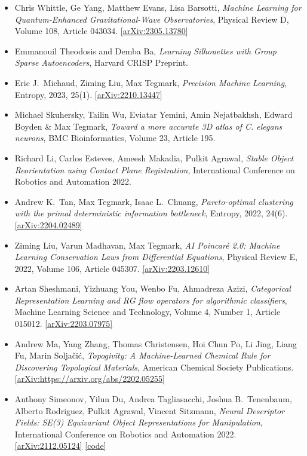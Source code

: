 \begin{itemize}
\item Chris Whittle, Ge Yang, Matthew Evans, Lisa Barsotti, \textit{Machine Learning for Quantum-Enhanced Gravitational-Wave Observatories}, Physical Review D, Volume 108, Article 043034. \href{https://arxiv.org/abs/2305.13780}{[arXiv:2305.13780]} 
\item Emmanouil Theodosis and Demba Ba, \textit{Learning Silhouettes with Group Sparse Autoencoders}, Harvard CRISP Preprint. 
\item Eric J.\  Michaud, Ziming Liu, Max Tegmark, \textit{Precision Machine Learning}, Entropy, 2023, 25(1). \href{https://arxiv.org/abs/2210.13447}{[arXiv:2210.13447]} 
\item Michael Skuhersky, Tailin Wu, Eviatar Yemini, Amin Nejatbakhsh, Edward Boyden & Max Tegmark, \textit{Toward a more accurate 3D atlas of C. elegans neurons}, BMC Bioinformatics, Volume 23, Article 195. 
\item Richard Li, Carlos Esteves, Ameesh Makadia, Pulkit Agrawal, \textit{Stable Object Reorientation using Contact Plane Registration}, International Conference on Robotics and Automation 2022. 
\item Andrew K.\  Tan, Max Tegmark, Isaac L.\  Chuang, \textit{Pareto-optimal clustering with the primal deterministic information bottleneck}, Entropy, 2022, 24(6). \href{https://arxiv.org/abs/2204.02489}{[arXiv:2204.02489]} 
\item Ziming Liu, Varun Madhavan, Max Tegmark, \textit{AI Poincaré 2.0: Machine Learning Conservation Laws from Differential Equations}, Physical Review E, 2022, Volume 106, Article 045307. \href{https://arxiv.org/abs/2203.12610}{[arXiv:2203.12610]} 
\item Artan Sheshmani, Yizhuang You, Wenbo Fu, Ahmadreza Azizi, \textit{Categorical Representation Learning and RG flow operators for algorithmic classifiers}, Machine Learning Science and Technology, Volume 4, Number 1, Article 015012. \href{https://arxiv.org/abs/2203.07975}{[arXiv:2203.07975]} 
\item Andrew Ma, Yang Zhang, Thomas Christensen, Hoi Chun Po, Li Jing, Liang Fu, Marin Soljačić, \textit{Topogivity: A Machine-Learned Chemical Rule for Discovering Topological Materials}, American Chemical Society Publications. \href{https://arxiv.org/abs/https://arxiv.org/abs/2202.05255}{[arXiv:https://arxiv.org/abs/2202.05255]} 
\item Anthony Simeonov, Yilun Du, Andrea Tagliasacchi, Joshua B.\  Tenenbaum, Alberto Rodriguez, Pulkit Agrawal, Vincent Sitzmann, \textit{Neural Descriptor Fields: SE(3) Equivariant Object Representations for Manipulation}, International Conference on Robotics and Automation 2022. \href{https://arxiv.org/abs/2112.05124}{[arXiv:2112.05124]}  \href{https://yilundu.github.io/ndf/}{[code]} 

\end{itemize}
